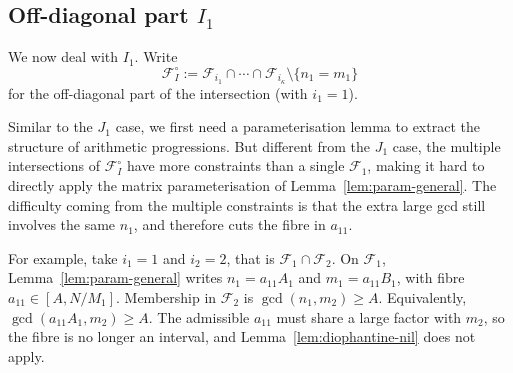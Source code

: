 \subsection{\texorpdfstring{Off-diagonal part $I_1$}{Off-diagonal part I_1}}
\label{sec:I1}

We now deal with $I_1$.
Write
\[
\mathscr{F}_I^\circ
:=\mathscr{F}_{i_1}\cap\cdots\cap\mathscr{F}_{i_\kappa}\setminus\{n_1=m_1\}
\]
for the off-diagonal part of the intersection (with $i_1=1$).

Similar to the $J_1$ case, we first need a parameterisation
lemma to extract the structure of arithmetic progressions.
But different from the $J_1$ case, the multiple intersections
of $\mathscr{F}_I^\circ$ have more constraints than a single $\mathscr{F}_1$, 
making it hard to directly apply the matrix parameterisation of Lemma~\ref{lem:param-general}.
The difficulty coming from the multiple constraints is that
the extra large gcd still involves the same $n_1$, and therefore cuts the fibre in $a_{11}$.


For example, take $i_1=1$ and $i_2=2$, that is $\mathscr{F}_1\cap\mathscr{F}_2$.
On $\mathscr{F}_1$, Lemma~\ref{lem:param-general} writes $n_1=a_{11}A_1$ and $m_1=a_{11}B_1$, with fibre $a_{11}\in[A,N/M_1]$.
Membership in $\mathscr{F}_2$ is $\gcd(n_1,m_2)\ge A$.
Equivalently, $\gcd(a_{11}A_1,m_2)\ge A$.
The admissible $a_{11}$ must share a large factor with $m_2$, so the fibre is no longer an interval, and Lemma~\ref{lem:diophantine-nil} does not apply.

